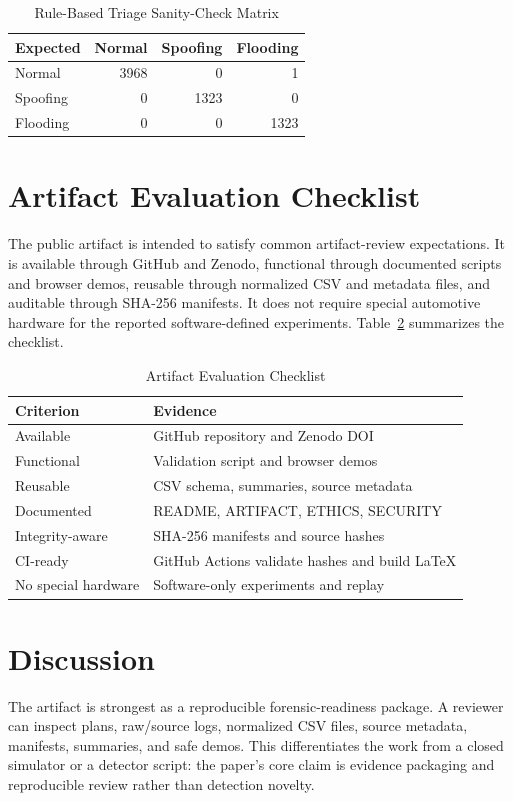 \documentclass[conference]{IEEEtran}
\begin{document}
\begin{table}[t]
\caption{Rule-Based Triage Sanity-Check Matrix}
\label{tab:triage}
\centering
\footnotesize
\begin{tabular}{lrrr}
\toprule
Expected & Normal & Spoofing & Flooding \\
\midrule
Normal & 3968 & 0 & 1 \\
Spoofing & 0 & 1323 & 0 \\
Flooding & 0 & 0 & 1323 \\
\bottomrule
\end{tabular}
\end{table}

\section{Artifact Evaluation Checklist}
The public artifact is intended to satisfy common artifact-review expectations. It is available through GitHub and Zenodo, functional through documented scripts and browser demos, reusable through normalized CSV and metadata files, and auditable through SHA-256 manifests. It does not require special automotive hardware for the reported software-defined experiments. Table~\ref{tab:artifactcheck} summarizes the checklist.

\begin{table}[t]
\caption{Artifact Evaluation Checklist}
\label{tab:artifactcheck}
\centering
\footnotesize
\begin{tabular}{p{}p{}}
\toprule
Criterion & Evidence \\
\midrule
Available & GitHub repository and Zenodo DOI \\
Functional & Validation script and browser demos \\
Reusable & CSV schema, summaries, source metadata \\
Documented & README, ARTIFACT, ETHICS, SECURITY \\
Integrity-aware & SHA-256 manifests and source hashes \\
CI-ready & GitHub Actions validate hashes and build LaTeX \\
No special hardware & Software-only experiments and replay \\
\bottomrule
\end{tabular}
\end{table}

\section{Discussion}
The artifact is strongest as a reproducible forensic-readiness package. A reviewer can inspect plans, raw/source logs, normalized CSV files, source metadata, manifests, summaries, and safe demos. This differentiates the work from a closed simulator or a detector script: the paper's core claim is evidence packaging and reproducible review rather than detection novelty.
\end{document}
